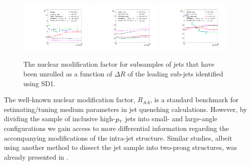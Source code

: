 \begin{figure}[th]
\centering
\includegraphics[width=0.32\textwidth]{figures/Observables_RAA/Plot9}
\includegraphics[width=0.32\textwidth]{figures/Observables_RAA/Plot3}
\includegraphics[width=0.32\textwidth]{figures/Observables_RAA/Plot4}
\caption{The nuclear modification factor for subsamples of jets that have been unrolled as a function of $\Delta R$ of the leading sub-jets identified using SD1. 
}
\label{fig:GroomedRAA}
\end{figure}
The well-known nuclear modification factor, $R_{AA}$, is a standard benchmark for estimating/tuning medium parameters in jet quenching calculations. However, by dividing the sample of inclusive high-$p_{\text{\tiny T}}$ jets into small- and large-angle configurations we gain access to more differential information regarding the accompanying modifications of the intra-jet structure. Similar studies, albeit using another method to dissect the jet sample into two-prong structures, was already presented in \cite{Zhang:2015trf,Apolinario:2017qay}.

